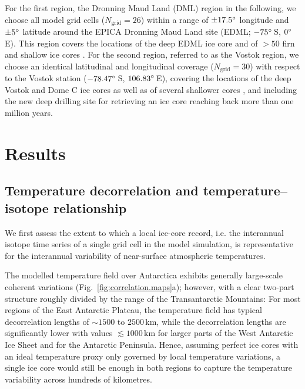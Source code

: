 \documentclass[cp, manuscript]{copernicus}
\begin{document}
For the first region, the Dronning Maud Land (DML) region in the following, we
choose all model grid cells ($N_{\mathrm{grid}}=26$) within a range of
$\pm17.5^{\circ}$ longitude and $\pm5^{\circ}$ latitude around the EPICA Dronning
Maud Land site (EDML; $-75^{\circ}$\,S, $0^{\circ}$\,E). This region covers the
locations of the deep EDML ice core \citep{EPICAcommunitymembers2006} and of
$>50$ firn and shallow ice cores \citep{Altnau2015}. For the second region,
referred to as the Vostok region, we choose an identical latitudinal and
longitudinal coverage ($N_{\mathrm{grid}}=30$) with respect to the Vostok
station ($-78.47^{\circ}$\,S, $106.83^{\circ}$\,E), covering the locations of the
deep Vostok and Dome C ice cores as well as of several shallower cores
\citep{Stenni2017}, and including the new deep drilling site for retrieving an
ice core reaching back more than one million years.

\section{Results}\label{results}

\subsection{Temperature decorrelation and temperature--isotope relationship}
\label{results:t2m-iso}

We first assess the extent to which a local ice-core record, i.e. the
interannual isotope time series of a single grid cell in the model simulation,
is representative for the interannual variability of near-surface atmospheric
temperatures.

The modelled temperature field over Antarctica exhibits generally large-scale
coherent variations (Fig.~\ref{fig:correlation.maps}a); however, with a clear
two-part structure roughly divided by the range of the Transantarctic Mountains:
For most regions of the East Antarctic Plateau, the temperature field has
typical decorrelation lengths of $\sim1500$ to $2500$\,km, while the
decorrelation lengths are significantly lower with values $\lesssim1000$\,km for
larger parts of the West Antarctic Ice Sheet and for the Antarctic Peninsula.
Hence, assuming perfect ice cores with an ideal temperature proxy only governed
by local temperature variations, a single ice core would still be enough in both
regions to capture the temperature variability across hundreds of kilometres.
\end{document}
